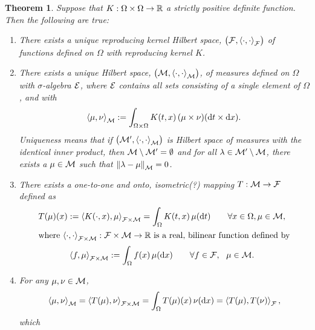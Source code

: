 \documentclass[reqno]{amsart}
\newtheorem{theorem}{Theorem}
\begin{document}
\begin{theorem} Suppose that $K: \Omega \times \Omega \to \reals$ a strictly positive definite function.  Then the following are true:
\begin{enumerate}
\renewcommand{\labelenumi}{\roman{enumi})}

    \item There exists a unique reproducing kernel Hilbert space, $\bigl(\cf,\ip[\cf]{\cdot}{\cdot}\bigr)$ of functions defined on $\Omega$ with reproducing kernel $K$.
    
    \item There exists a unique Hilbert space, $\bigl(\cm,\ip[\cm]{\cdot}{\cdot}\bigr)$, of measures defined on $\Omega$ with $\sigma$-algebra $\ce$, where $\ce$ contains all sets consisting of a single element of $\Omega$, and with
    \begin{equation} \label{eq:Mipdef}
    \ip[\cm]{\mu}{\nu} := \int_{\Omega \times \Omega} K(t,x) \, (\mu \times \nu) (\dif t \times \dif x).
    \end{equation}
    Uniqueness means that if $\bigl(\cm',\ip[\cm]{\cdot}{\cdot}\bigr)$ is Hilbert space of measures with the identical inner product, then $\cm \setminus \cm' = \emptyset$ and for all $\lambda \in \cm' \setminus \cm$, there exists a $\mu \in \cm$ such that $\norm[\cm]{\lambda - \mu} = 0$.
    
    
    \item \label{thmiii} There exists a \emph{one-to-one and onto, isometric(?) mapping} $T : \cm \to \cf$ defined as 
    \begin{subequations}
\begin{gather}
    T(\mu)(x) := \ip[\cf \times \cm]{K(\cdot, x)}{\mu} = \int_\Omega K(t, x) \, \mu(\dif t) \qquad \forall x \in \Omega, \mu \in \cm, \\
    \intertext{where $ \ip[\cf \times \cm]{\cdot}{\cdot} : \cf \times \cm \to \reals$ is a real, bilinear function defined by} 
    \ip[\cf \times \cm]{f}{\mu} := \int_\Omega f(x) \, \mu(\dif x) \qquad \forall f \in \cf, \ \  \mu \in \cm.
\end{gather}
\end{subequations}



\item For any $\mu, \nu \in \cm$,
\begin{equation}
    \ip[\cm]{\mu}{\nu} = \ip[\cf \times \cm]{T(\mu)}{\nu} = \int_\Omega T(\mu)(x) \, \nu(\dif x) = \ip[\cf]{T(\mu)}{T(\nu)},
\end{equation}
which 
\end{enumerate}

\end{theorem}
\end{document}
